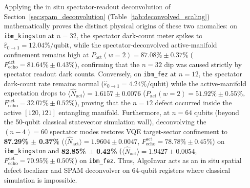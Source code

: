 \documentclass[aps,pra,reprint,superscriptaddress,floatfix,nofootinbib]{revtex4-2}
\begin{document}
\begin{enumerate}
    Applying the in situ spectator-readout deconvolution of Section~\ref{sec:spam_deconvolution} (Table~\ref{tab:deconvolved_scaling}) mathematically proves the distinct physical origins of these two anomalies: on \texttt{ibm\_kingston} at $n = 32$, the spectator dark-count meter spikes to $\hat{\varepsilon}_{0\to 1} = 12.04\%/\text{qubit}$, while the spectator-deconvolved active-manifold confinement remains high at $P_{\text{act}}(w=2) = 87.08\% \pm 0.37\%$ ($F_{\text{echo}}^{\text{act}} = 81.64\% \pm 0.43\%$), confirming that the $n = 32$ dip was caused strictly by spectator readout dark counts. Conversely, on \texttt{ibm\_fez} at $n = 12$, the spectator dark-count rate remains normal ($\hat{\varepsilon}_{0\to 1} = 4.24\%/\text{qubit}$) while the active-manifold expectation drops to $\langle \hat{N}_{\text{act}} \rangle = 1.6157 \pm 0.0076$ ($P_{\text{act}}(w=2) = 51.92\% \pm 0.55\%$, $F_{\text{echo}}^{\text{act}} = 32.07\% \pm 0.52\%$), proving that the $n = 12$ defect occurred inside the active $[120, 121]$ entangling manifold. Furthermore, at $n = 64$ qubits (beyond the 50-qubit classical statevector simulation wall), deconvolving the $(n - 4) = 60$ spectator modes restores VQE target-sector confinement to \textbf{87.29\% $\pm$ 0.37\%} ($\langle \hat{N}_{\text{act}} \rangle = 1.9604 \pm 0.0047$, $F_{\text{echo}}^{\text{act}} = 78.78\% \pm 0.45\%$) on \texttt{ibm\_kingston} and \textbf{82.85\% $\pm$ 0.42\%} ($\langle \hat{N}_{\text{act}} \rangle = 1.9427 \pm 0.0054$, $F_{\text{echo}}^{\text{act}} = 70.95\% \pm 0.50\%$) on \texttt{ibm\_fez}. Thus, AlgoInvar acts as an in situ spatial defect localizer and SPAM deconvolver on 64-qubit registers where classical simulation is impossible.


\end{enumerate}
\end{document}
